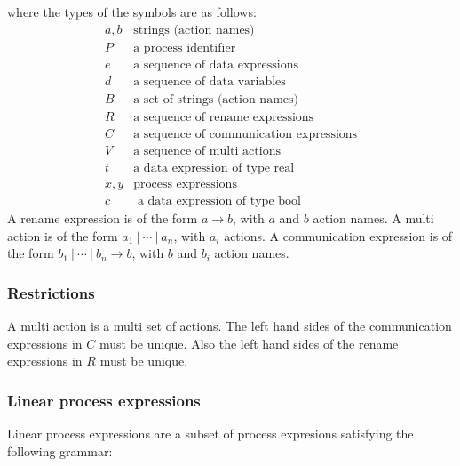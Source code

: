 \documentclass{article}
\begin{document}
where the types of the symbols are as follows:%
\[
\begin{array}{cl}
a,b & \text{strings (action names)} \\ 
P & \text{a process identifier} \\ 
e & \text{a sequence of data expressions} \\ 
d & \text{a sequence of data variables} \\ 
B & \text{a set of strings (action names) } \\ 
R & \text{a sequence of rename expressions} \\ 
C & \text{a sequence of communication expressions} \\ 
V & \text{a sequence of multi actions} \\ 
t & \text{a data expression of type real} \\ 
x,y & \text{process expressions} \\ 
c & \text{ a data expression of type bool}%
\end{array}%
\]%
A rename expression is of the form $a\rightarrow b$, with $a$ and $b$ action
names. A multi action is of the form $a_{1}\ |\ \cdots \ |\ a_{n}$, with $%
a_{i}$ actions. A communication expression is of the form $b_{1}\ |\ \cdots
\ |\ b_{n}\rightarrow b$, with $b$ and $b_{i}$ action names.

\subsubsection{Restrictions}

A multi action is a multi set of actions. The left hand sides of the
communication expressions in $C$ must be unique. Also the left hand sides of
the rename expressions in $R$ must be unique.\pagebreak

\subsubsection{Linear process expressions}

Linear process expressions are a subset of process expresions satisfying the
following grammar:
\end{document}
